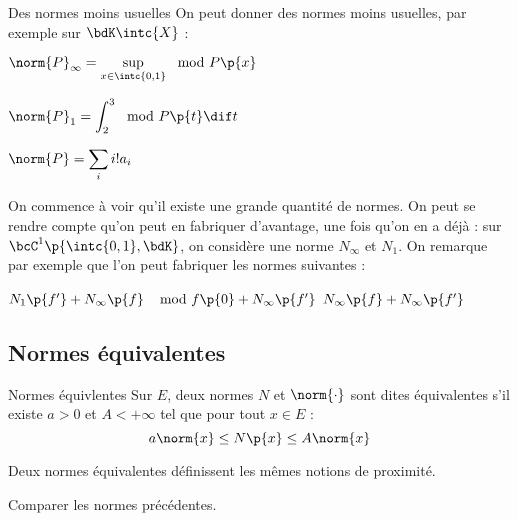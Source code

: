 \documentclass[a4paper,french,bookmarks]{book}
\begin{document}
    \begin{example}{Des normes moins usuelles}{}
        On peut donner des normes moins usuelles, par exemple sur $\bdK\intc{X}$ :
        \begin{enumerate}
            \itt $\norm{P}_\infty = \sup\limits_{x \in \intc{0, 1}} \mod{P\p{x}}$
            
            \itt $\norm{P}_1 = \displaystyle\int_2^3 \mod{P\p{t}}\dif t$
            
            \itt $\norm{P} = \displaystyle\sum_i i! a_i$
        \end{enumerate}
    \end{example}
    On commence à voir qu'il existe une grande quantité de normes. On peut se rendre compte qu'on peut en fabriquer d'avantage, une fois qu'on en a déjà : sur $\bcC^1\p{\intc{0, 1}, \bdK}$, on considère une norme $N_\infty$ et $N_1$. On remarque par exemple que l'on peut fabriquer les normes suivantes :
    \begin{enumerate}
        \itt $N_1\p{f'} + N_\infty\p{f}$
        \itt $\mod{f\p{0}} + N_\infty\p{f'}$
        \itt $N_\infty\p{f} + N_\infty\p{f'}$
    \end{enumerate}
    
    \subsection{Normes équivalentes}
    
    \begin{definition}{Normes équivlentes}
        Sur $E$, deux normes $N$ et $\norm{\cdot}$ sont dites équivalentes s'il existe $a > 0$ et $A < +\infty$ tel que pour tout $x \in E$ :
        \[ a \norm{x} \leq N\p{x} \leq A\norm{x} \]
    \end{definition}
    Deux normes équivalentes définissent les mêmes notions de proximité.
    \begin{exercise}{}{}
        Comparer les normes précédentes.
    \end{exercise}
    
\end{document}
